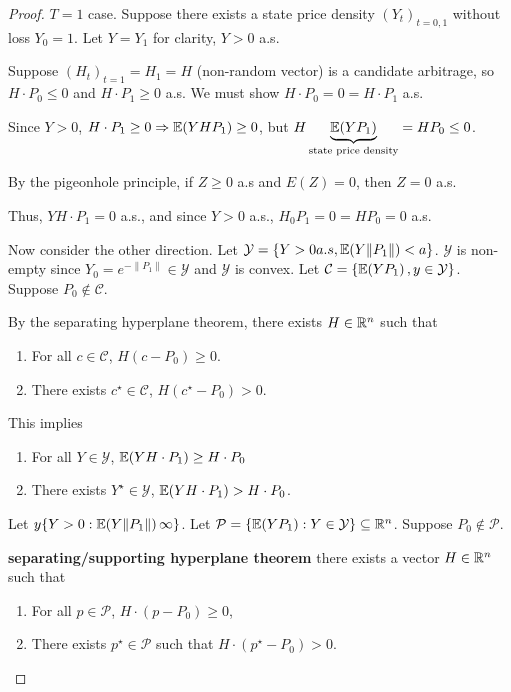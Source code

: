\begin{proof}
  $T = 1$ case.  Suppose there exists a state price density
  $(Y_{t})_{t = 0, 1}$ without loss $Y_{0} = 1$.  Let $Y = Y_{1}$ for
  clarity, $Y > 0$ a.s.

  Suppose $(H_{t})_{t = 1} = H_{1} = H$ (non-random vector) is a
  candidate arbitrage, so $H \cdot P_{0} \leq 0$ and $H \cdot P_{1}
  \geq 0$ a.s.  We must show $H \cdot P_{0} = 0 = H \cdot P_{1}$ a.s.

  Since $Y > 0$, $H \cdot P_{1} \geq 0 \Rightarrow \E{Y H P_{1}} \geq
    0$, but $H \underbrace{\E{Y P_{1}}}_{\text{state price density}} =
    H P_{0} \leq 0$.

  By the pigeonhole principle, if $Z \geq 0$ a.s and $E(Z) = 0$, then
  $Z = 0$ a.s.

  Thus, $Y H \cdot P_{1} = 0$ a.s., and since $Y > 0$ a.s., $H_{0}
  P_{1} = 0 = H P_{0} = 0$ a.s.

  Now consider the other direction.  Let $\mathcal{Y} = \{ Y > 0 a.s,
  \E{Y \| P_{1} \|} < a \}$.  $\mathcal{Y}$ is non-empty since $Y_{0}
  = e^{-\| P_{1} \|} \in \mathcal{Y}$ and $\mathcal{Y}$ is convex.
  Let $\mathcal{C} = \{ \E{YP_{1}}, y \in \mathcal{Y} \}$.  Suppose
  $P_{0} \notin \mathcal{C}$.

  By the separating hyperplane theorem, there exists $H \in \mathbb{R}^{n}$ such
  that
  \begin{enumerate}
  \item For all $c \in \mathcal{C}$, $H(c - P_{0}) \geq 0$.
  \item There exists $c^{\star} \in \mathcal{C}$, $H(c^{\star} - P_{0}) > 0$.
  \end{enumerate}

  This implies
  \begin{enumerate}
  \item For all $Y \in \mathcal{Y}$, $\E{YH \cdot P_{1}} \geq H \cdot
    P_{0}$
  \item There exists $Y^{\star} \in \mathcal{Y}$, $\E{Y H \cdot P_{1}} > H
    \cdot P_{0}$.
  \end{enumerate}

  Let $y \{ Y > 0: \E{Y \| P_{1} \|} \infty \}$.  Let $\mathcal{P} =
  \{ \E{YP_{1}} : Y \in \mathcal{Y} \} \subseteq \R^{n}$. Suppose
  $P_{0} \notin \mathcal{P}$.

  \textbf{separating/supporting hyperplane theorem} there exists a
  vector $H \in \mathbb{R}^{n}$ such that
  \begin{enumerate}
  \item For all $p \in \mathcal{P}$, $H \cdot (p - P_{0}) \geq 0$,
  \item There exists $p^{\star} \in \mathcal{P}$ such that $H \cdot
    (p^{\star} - P_{0}) > 0$.
  \end{enumerate}


\end{proof}
